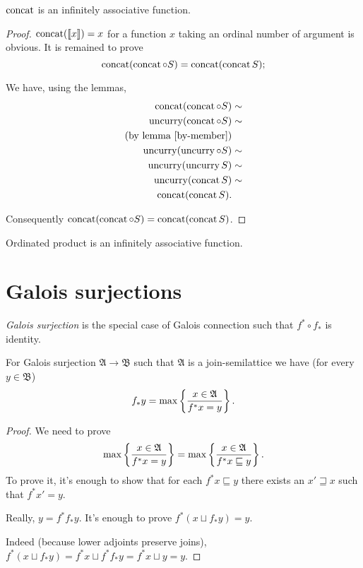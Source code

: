 \begin{thm}
$\operatorname{concat}$ is an infinitely associative function.\end{thm}
\begin{proof}
$\operatorname{concat}(\llbracket x\rrbracket)=x$ for a function $x$ taking an
ordinal number of argument is obvious. It is remained to prove
\[
\operatorname{concat}(\operatorname{concat}\circ S)=\operatorname{concat}(\operatorname{concat} S);
\]


We have, using the lemmas,
\begin{align*}
\operatorname{concat}(\operatorname{concat}\circ S) & \sim\\
\operatorname{uncurry}(\operatorname{concat}\circ S) & \sim\\
\text{(by lemma \ref{by-member})}\\
\operatorname{uncurry}(\operatorname{uncurry}\circ S) & \sim\\
\operatorname{uncurry}(\operatorname{uncurry} S) & \sim\\
\operatorname{uncurry}(\operatorname{concat} S) & \sim\\
\operatorname{concat}(\operatorname{concat} S).
\end{align*}


Consequently $\operatorname{concat}(\operatorname{concat}\circ S)=\operatorname{concat}(\operatorname{concat} S)$.\end{proof}
\begin{cor}
Ordinated product is an infinitely associative function.
\end{cor}

\section{Galois surjections}

\begin{defn}
  \emph{Galois surjection} is the special case of Galois connection such
  that $f^{\ast} \circ f_{\ast} $ is identity.
\end{defn}

\begin{prop}\label{gal-eq}
  For Galois surjection $\mathfrak{A} \rightarrow \mathfrak{B}$ such that
  $\mathfrak{A}$ is a join-semilattice we have (for every $y \in
  \mathfrak{B}$)
  \[ f_{\ast} y = \max \left\{ \frac{ x \in \mathfrak{A} }{
     f^{\ast} x = y }\right\} . \]
\end{prop}

\begin{proof}
  We need to prove
  \[ \max \left\{ \frac{ x \in \mathfrak{A} }{ f^{\ast} x = y }\right\} =
     \max \left\{ \frac{ x \in \mathfrak{A} }{ f^{\ast} x \sqsubseteq y }\right\} . \]
  To prove it, it's enough to show that for each $f^{\ast} x \sqsubseteq y$
  there exists an $x' \sqsupseteq x$ such that $f^{\ast} x' = y$.
  
  Really, $y = f^{\ast} f_{\ast} y$. It's enough to prove $f^{\ast} (x \sqcup
  f_{\ast} y) = y$.
  
  Indeed (because lower adjoints preserve joins),
  $f^{\ast} (x \sqcup f_{\ast} y) = f^{\ast} x \sqcup f^{\ast} f_{\ast} y = f^{\ast} x \sqcup y = y$.
\end{proof}

